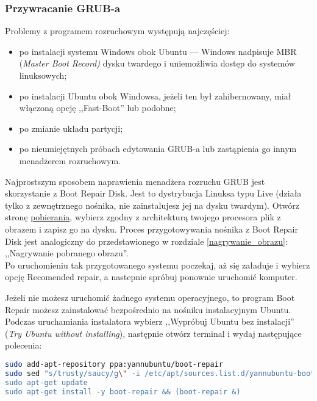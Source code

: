 \subsubsection{Przywracanie GRUB-a}
\label{grub_przywracanie}
Problemy z programem rozruchowym występują najczęściej:
\begin{itemize}
\item po instalacji systemu Windows obok Ubuntu --- Windows nadpisuje MBR (\textit{Master Boot Record)} dysku twardego i uniemożliwia dostęp do systemów linuksowych;
\item po instalacji Ubuntu obok Windowsa, jeżeli ten był zahibernowany, miał włączoną opcję \linebreak ,,Fast-Boot'' lub podobne;
\item po zmianie układu partycji;
\item po nieumiejętnych próbach edytowania GRUB-a lub zastąpienia go innym menadżerem rozruchowym.
\end{itemize}

Najprostszym sposobem naprawienia menadżera rozruchu GRUB jest skorzystanie z Boot Repair Disk. Jest to dystrybucja Linuksa typu Live (działa tylko z zewnętrznego nośnika, nie zainstalujesz jej na dysku twardym). Otwórz stronę \href{http://sourceforge.net/projects/boot-repair-cd/files/}{pobierania}, wybierz zgodny z architekturą twojego procesora plik z obrazem i zapisz go na dysku. Proces przygotowywania nośnika z Boot Repair Disk jest analogiczny do przedstawionego w rozdziale \ref{nagrywanie_obrazu}: ,,Nagrywanie pobranego obrazu''.\\
Po uruchomieniu tak przygotowanego systemu poczekaj, aż się załaduje i wybierz opcję \textcolor{ubuntu_orange}{Recomended repair}, a nastepnie spróbuj ponownie uruchomić komputer.

Jeżeli nie możesz uruchomić żadnego systemu operacyjnego, to program Boot Repair możesz zainstalować bezpośrednio na nośniku instalacyjnym Ubuntu. Podczas uruchamiania instalatora wybierz ,,Wypróbuj Ubuntu bez instalacji'' (\textit{Try Ubuntu without installing}), następnie otwórz terminal  i wydaj następujące polecenia:

\begin{lstlisting}[language=bash]
sudo add-apt-repository ppa:yannubuntu/boot-repair
sudo sed "s/trusty/saucy/g\" -i /etc/apt/sources.list.d/yannubuntu-boot-repair-trusty.list
sudo apt-get update
sudo apt-get install -y boot-repair && (boot-repair &)
\end{lstlisting}

